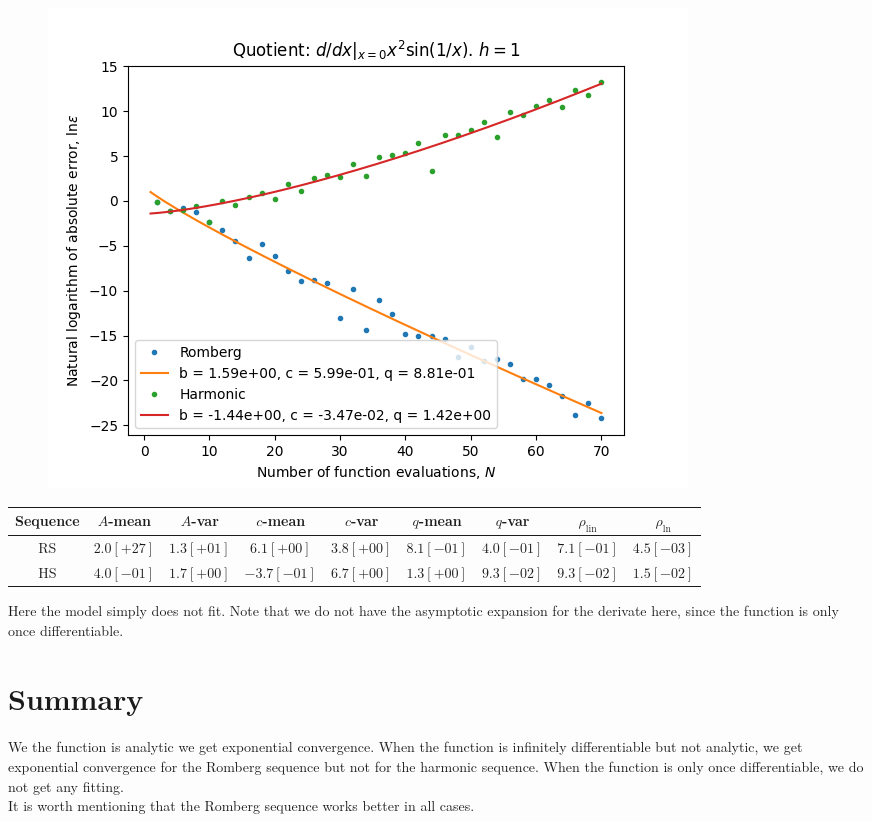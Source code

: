 \begin{figure}[H]
\centering
\begin{minipage}{0.45\textwidth}
\centering
\includegraphics[scale=0.45]{../results/diff_quot_plots/xsin_hp_trend.png}
\end{minipage}
\end{figure}

\begin{table}[H]
    \centering
    \small
    \small
    \begin{tabular}{c||c|c|c|c|c|c|c|c}
Sequence & \(A\)-mean & \(A\)-var & \(c\)-mean & \(c\)-var & \(q\)-mean & \(q\)-var & \(\rho_{\operatorname{lin}}\)& \(\rho_{\ln}\)\\\hline
\rowcolor{red}
RS & \(2.0[+27]\) & \(1.3[+01]\) & \(6.1[+00]\) & \(3.8[+00]\) & \(8.1[-01]\) & \(4.0[-01]\) & \(7.1[-01]\) & \(4.5[-03]\) \\
\rowcolor{red}
HS & \(4.0[-01]\) & \(1.7[+00]\) & \(-3.7[-01]\) & \(6.7[+00]\) & \(1.3[+00]\) & \(9.3[-02]\) & \(9.3[-02]\) & \(1.5[-02]\) \\
    \end{tabular}
    \label{tab:my_label}
\end{table}

Here the model simply does not fit. Note that we do not have the asymptotic expansion for the derivate here, since the function is only once differentiable.\\

\section{Summary}

We the function is analytic we get exponential convergence. When the function is infinitely differentiable but not analytic, we get exponential convergence for the Romberg sequence but not for the harmonic sequence. When the function is only once differentiable, we do not get any fitting.\\

It is worth mentioning that the Romberg sequence works better in all cases.
